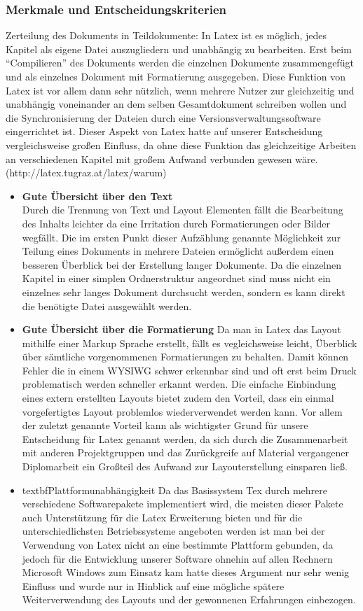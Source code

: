 \subsubsection{Merkmale und Entscheidungskriterien}
Zerteilung des Dokuments in Teildokumente:
In Latex ist es möglich, jedes Kapitel als eigene Datei auszugliedern und unabhängig zu bearbeiten. Erst beim “Compilieren” des Dokuments werden die einzelnen Dokumente zusammengefügt und als einzelnes Dokument mit Formatierung ausgegeben.
Diese Funktion von Latex ist vor allem dann sehr nützlich, wenn mehrere Nutzer zur gleichzeitig und unabhängig voneinander an dem selben Gesamtdokument schreiben wollen und die Synchronisierung der Dateien durch eine Versionsverwaltungssoftware eingerrichtet ist.
Dieser Aspekt von Latex hatte auf unserer Entscheidung vergleichsweise großen Einfluss, da ohne diese Funktion das gleichzeitige Arbeiten an verschiedenen Kapitel mit großem Aufwand verbunden gewesen wäre.(http://latex.tugraz.at/latex/warum)
\begin{itemize}
\item \textbf{Gute Übersicht über den Text}\\
Durch die Trennung von Text und Layout Elementen fällt die Bearbeitung des Inhalts leichter da eine Irritation durch Formatierungen oder Bilder wegfällt.
Die im ersten Punkt dieser Aufzählung genannte Möglichkeit zur Teilung eines Dokuments in mehrere Dateien ermöglicht außerdem einen besseren Überblick bei der Erstellung langer Dokumente. Da die einzelnen Kapitel in einer simplen Ordnerstruktur angeordnet sind muss nicht ein einzelnes sehr langes Dokument durchsucht werden, sondern es kann direkt die benötigte Datei ausgewählt werden.
\item \textbf{Gute Übersicht über die Formatierung}
Da man in Latex das Layout mithilfe einer Markup Sprache erstellt, fällt es vegleichsweise leicht, Überblick über sämtliche vorgenommenen Formatierungen zu behalten. Damit können Fehler die in einem WYSIWG schwer erkennbar sind und oft erst beim Druck problematisch werden schneller erkannt werden.
Die einfache Einbindung eines extern erstellten Layouts bietet zudem den Vorteil, dass ein einmal vorgefertigtes Layout problemlos wiederverwendet werden kann.
Vor allem der zuletzt genannte Vorteil kann als wichtigster Grund für unsere Entscheidung für Latex genannt werden, da sich durch die Zusammenarbeit mit anderen Projektgruppen und das Zurückgreife auf Material vergangener Diplomarbeit ein Großteil des Aufwand zur Layouterstellung einsparen ließ.
\item textbf{Plattformunabhängigkeit}
Da das Basissystem Tex durch mehrere verschiedene Softwarepakete implementiert wird, die meisten dieser Pakete auch Unterstützung für die Latex Erweiterung bieten und für die unterschiedlichsten Betriebssysteme angeboten werden ist man bei der Verwendung von Latex nicht an eine bestimmte Plattform gebunden, da jedoch für die Entwicklung unserer Software ohnehin auf allen Rechnern Microsoft Windows zum Einsatz kam hatte dieses Argument nur sehr wenig Einfluss und wurde nur in Hinblick auf eine mögliche spätere Weiterverwendung des Layouts und der gewonnenen Erfahrungen einbezogen.
\end{itemize}
